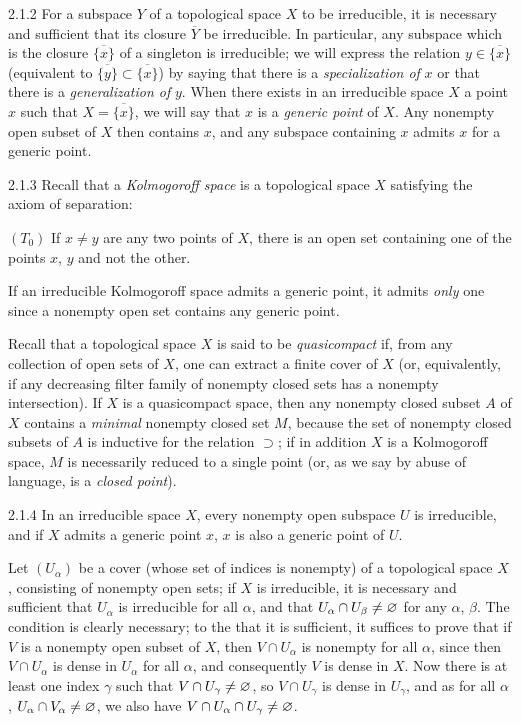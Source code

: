 \documentclass[10pt,oneside]{book}
\begin{document}
\begin{env}{2.1.2}
\label{env-0.2.1.2}
For a subspace $Y$ of a topological space $X$ to be irreducible, it is necessary and
sufficient that its closure $\overline{Y}$ be irreducible. In particular, any subspace which
is the closure $\overline{\{x\}}$ of a singleton is irreducible; we will express the relation
$y\in\overline{\{x\}}$ (equivalent to $\overline{\{y\}}\subset\overline{\{x\}}$) by saying
that there is a \emph{specialization of} $x$ or that there is a \emph{generalization of} $y$.
When there exists in an irreducible space $X$ a point $x$ such that $X=\overline{\{x\}}$, we
will say that $x$ is a \emph{generic point} of $X$. Any nonempty open subset of $X$ then
contains $x$, and any subspace containing $x$ admits $x$ for a generic point.
\end{env}

\begin{env}{2.1.3}
\label{env-0.2.1.3}
Recall that a \emph{Kolmogoroff space} is a topological space $X$ satisfying the axiom of
separation:

$(T_0)$ If $x\neq y$ are any two points of $X$, there is an open set containing one of the
points $x$, $y$ and not the other.

If an irreducible Kolmogoroff space admits a generic point, it admits \emph{only} one since a
nonempty open set contains any generic point.

Recall that a topological space $X$ is said to be \emph{quasicompact} if, from any collection
of open sets of $X$, one can extract a finite cover of $X$ (or, equivalently, if any
decreasing filter family of nonempty closed sets has a nonempty intersection). If $X$ is a
quasicompact space, then any nonempty closed subset $A$ of $X$ contains a \emph{minimal}
nonempty closed set $M$, because the set of nonempty closed subsets of $A$ is inductive for
the relation $\supset$; if in addition $X$ is a Kolmogoroff space, $M$ is necessarily reduced
to a single point (or, as we say by abuse of language, is a \emph{closed point}).
\end{env}

\begin{env}{2.1.4}
\label{env-0.2.1.4}
In an irreducible space $X$, every nonempty open subspace $U$ is irreducible, and if $X$
admits a generic point $x$, $x$ is also a generic point of $U$.

Let $(U_\alpha)$ be a cover (whose set of indices is nonempty) of a topological space $X$,
consisting of nonempty open sets; if $X$ is irreducible, it is necessary and sufficient that
$U_\alpha$ is irreducible for all $\alpha$, and that $U_\alpha\cap U_\beta\neq\varnothing$ for any
$\alpha$, $\beta$. The condition is clearly necessary; to the that it is sufficient, it
suffices to prove that if $V$ is a nonempty open subset of $X$, then $V\cap U_\alpha$ is
nonempty for all $\alpha$, since then $V\cap U_\alpha$ is dense in $U_\alpha$ for all
$\alpha$, and consequently $V$ is dense in $X$. Now there is at least one index $\gamma$ such
that $V\cap U_\gamma\neq\varnothing$, so $V\cap U_\gamma$ is dense in $U_\gamma$, and as for all
$\alpha$, $U_\alpha\cap V_\alpha\neq\varnothing$, we also have
$V\cap U_\alpha\cap U_\gamma\neq\varnothing$.
\end{env}
\end{document}
